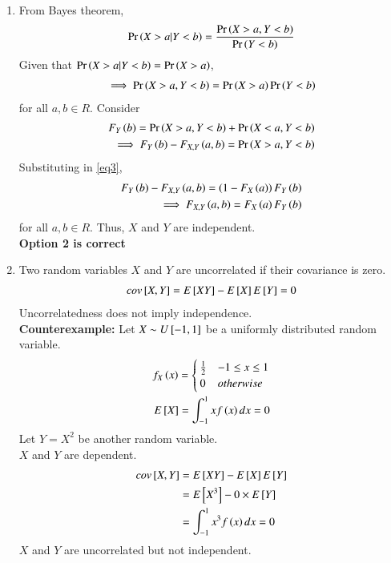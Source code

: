 \documentclass[journal,12pt,twocolumn]{IEEEtran}
\begin{document}
\begin{enumerate}
    \item From Bayes theorem,
    \begin{align}
      \Pr\left(X>a|Y<b\right)=\frac{\Pr\left(X>a,Y<b\right)}{\Pr\left(Y<b\right)}
    \end{align}
    Given that $\Pr\left(X>a|Y<b\right)=\Pr\left(X>a\right)$,
    \begin{align}
        \label{eq3}\implies \Pr\left(X>a,Y<b\right)=\Pr\left(X>a\right)\Pr\left(Y<b\right)
    \end{align}
    for all $a,b\in R$. Consider
    \begin{align}
        F_Y\left(b\right)=\Pr\left(X>a,Y<b\right)+\Pr\left(X<a,Y<b\right)\\
        \implies F_Y\left(b\right)-F_{X,Y}\left(a,b\right)=\Pr\left(X>a,Y<b\right)
    \end{align}
    Substituting in \eqref{eq3},
    \begin{align}
        F_Y\left(b\right)-F_{X,Y}\left(a,b\right)=\left(1-F_X\left(a\right)\right)F_Y\left(b\right)\\
        \implies F_{X,Y}\left(a,b\right)=F_X\left(a\right)F_Y\left(b\right)
    \end{align}
    for all $a,b\in R$. Thus, $X$ and $Y$ are independent. \\
    \textbf{Option 2 is correct}
    \item Two random variables $X$ and $Y$ are uncorrelated if their covariance is zero.
    \begin{align}
        cov{}\left[X,Y\right]=E{}\left[XY\right]-E{}\left[X\right]E{}\left[Y\right]=0
    \end{align}
    Uncorrelatedness does not imply independence.\\
    \textbf{Counterexample:} Let $X\sim U {}\left[-1,1\right]$ be a uniformly distributed random variable.
    \begin{align}
        f_X\left(x\right)=
        \begin{cases}
        \frac{1}{2} & -1\leq x \leq 1\\
        0 & otherwise
        \end{cases}\\
        E{}\left[X\right]=\int_{-1}^{1}x f\left(x\right) dx=0
    \end{align}
    Let $Y=X^2$ be another random variable.\\
    $X$ and $Y$ are dependent.
    \begin{align}
        cov{}\left[X,Y\right]&=E{}\left[XY\right]-E{}\left[X\right]E{}\left[Y\right]\\
        &=E{}\left[X^3\right]-0\times E{}\left[Y\right]\\
        &=\int_{-1}^{1}x^3 f\left(x\right) dx=0
    \end{align}
    $X$ and $Y$ are uncorrelated but not independent.\\

\end{enumerate}
\end{document}
